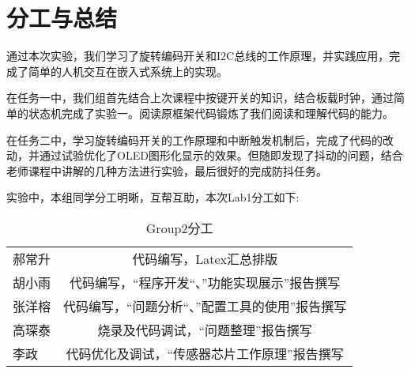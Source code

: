 \section{分工与总结}
\par{通过本次实验，我们学习了旋转编码开关和I2C总线的工作原理，并实践应用，完成了简单的人机交互在嵌入式系统上的实现。}
\par{在任务一中，我们组首先结合上次课程中按键开关的知识，结合板载时钟，通过简单的状态机完成了实验一。阅读原框架代码锻炼了我们阅读和理解代码的能力。}
\par{在任务二中，学习旋转编码开关的工作原理和中断触发机制后，完成了代码的改动，并通过试验优化了OLED图形化显示的效果。但随即发现了抖动的问题，结合老师课程中讲解的几种方法进行实验，最后很好的完成防抖任务。}
\par{实验中，本组同学分工明晰，互帮互助，本次Lab1分工如下:}
\begin{table}[h]
	\centering
	\begin{tabular}{|l|c|}
		郝常升&代码编写，Latex汇总排版\\
		胡小雨&代码编写，“程序开发“、”功能实现展示”报告撰写\\
		张洋榕&代码编写，“问题分析“、”配置工具的使用”报告撰写\\
		高琛泰&烧录及代码调试，“问题整理”报告撰写\\
		李政&代码优化及调试，“传感器芯片工作原理”报告撰写\\
	\end{tabular}
	\caption{Group2分工}
	\label{tab:Margin_settings}
\end{table} 